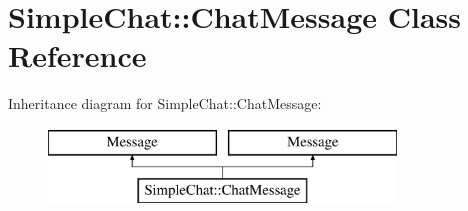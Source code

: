 \hypertarget{classSimpleChat_1_1ChatMessage}{\section{Simple\-Chat\-:\-:Chat\-Message Class Reference}
\label{classSimpleChat_1_1ChatMessage}
}
Inheritance diagram for Simple\-Chat\-:\-:Chat\-Message\-:\begin{figure}[H]
\begin{center}
\leavevmode
\includegraphics[height=2.000000cm]{classSimpleChat_1_1ChatMessage}
\end{center}
\end{figure}
